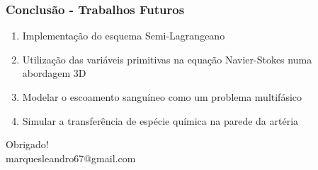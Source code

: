 \begin{frame}
 \frametitle{\Large Conclusão - Trabalhos Futuros}
 \vspace{-1cm}
\begin{enumerate}
 \item Implementação do esquema Semi-Lagrangeano\\

 \vspace{0.8cm}
 
 \item Utilização das variáveis primitivas na equação Navier-Stokes numa abordagem 3D\\
 
 \vspace{0.8cm}

 \item Modelar o escoamento sanguíneo como um problema multifásico\\
 
 \vspace{0.8cm}

 \item Simular a transferência de espécie química na parede da artéria
\end{enumerate}
\end{frame}


\begin{frame}
 \centering
 \vspace{-1cm}
 \Huge Obrigado!\\
 \vspace{0.5cm}
 \small marquesleandro67@gmail.com
\end{frame}





